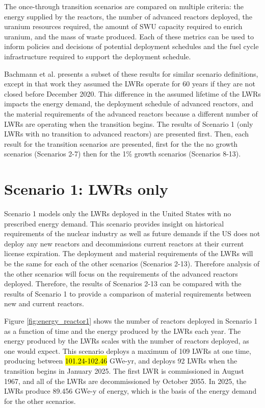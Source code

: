 The once-through transition scenarios are compared on multiple 
criteria: the energy supplied by the reactors, the number of advanced reactors deployed, 
the uranium resources required, the amount of \gls{SWU} capacity required 
to enrich uranium,
and the mass of waste produced. Each of these metrics can be used to inform 
policies and decisions of potential deployment schedules and the 
fuel cycle infrastructure required to support the deployment schedule. 

Bachmann et al. \cite{bachmann_enrichment_2021} presents a subset of 
these results for similar scenario definitions, except in that work 
they assumed the 
\glspl{LWR} operate for 60 years if they are not closed before December 
2020. This difference in 
the assumed lifetime of the \glspl{LWR} impacts the energy demand, 
the deployment schedule of advanced reactors, and the material 
requirements of the advanced reactors because a different number of 
\glspl{LWR} are operating when the transition begins. The results of 
Scenario 1 (only \glspl{LWR} with no transition to advanced reactors) 
are presented first. Then, each result for the transition scenarios are 
presented, first for the the no growth scenarios 
(Scenarios 2-7) then for the 1\% growth scenarios (Scenarios 
8-13).

\section{Scenario 1: LWRs only}\label{sec:scenario1}
Scenario 1 models only the \glspl{LWR} deployed in the United States with no 
prescribed energy demand. This scenario provides insight on historical 
requirements of the nuclear industry as well as future demands if the 
US does not deploy any new reactors and decommissions current reactors at 
their current license expiration. The 
deployment and material requirements of the \glspl{LWR} will be the same 
for each of the other scenarios (Scenarios 2-13). Therefore analysis 
of the other scenarios will focus on the requirements of 
the advanced reactors deployed. Therefore, the results of Scenarios 2-13 
can be compared with the results of Scenario 1 to provide a comparison 
of material requirements between new and current reactors. 

Figure \ref{fig:energy_reactor1} shows the number of 
reactors deployed in Scenario 1 as a function of time and the energy 
produced by the \glspl{LWR} each year. The energy produced by the 
\glspl{LWR} scales with the number of reactors deployed, as 
one would expect. This scenario deploys a maximum of 109 
\glspl{LWR} at one time, producing 
between \hl{101.24-102.46} GWe-yr, and deploys 92 \glspl{LWR}
when the transition begins in January 2025. The first \gls{LWR} is 
commissioned in August 1967, and all of the \glspl{LWR} are
decommissioned by October 2055. In 2025, the \glspl{LWR} produce 
89.456 GWe-y of energy, which is the basis of the energy demand for 
the other scenarios. 

